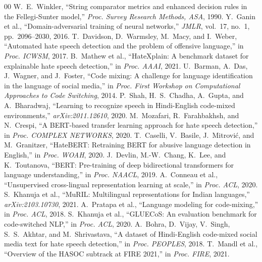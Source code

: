 \documentclass[conference]{IEEEtran}
\begin{document}
\begin{thebibliography}{00}
 W.~E.~Winkler, ``String comparator metrics and enhanced decision rules in the Fellegi-Sunter model,'' \textit{Proc. Survey Research Methods, ASA}, 1990.
 Y.~Ganin et al., ``Domain-adversarial training of neural networks,'' \textit{JMLR}, vol.~17, no.~1, pp.~2096--2030, 2016.
 T.~Davidson, D.~Warmsley, M.~Macy, and I.~Weber, ``Automated hate speech detection and the problem of offensive language,'' in \textit{Proc. ICWSM}, 2017.
 B.~Mathew et al., ``HateXplain: A benchmark dataset for explainable hate speech detection,'' in \textit{Proc. AAAI}, 2021.
 U.~Barman, A.~Das, J.~Wagner, and J.~Foster, ``Code mixing: A challenge for language identification in the language of social media,'' in \textit{Proc. First Workshop on Computational Approaches to Code Switching}, 2014.
 P.~Shah, H.~S.~Chadha, A.~Gupta, and A.~Bharadwaj, ``Learning to recognize speech in Hindi-English code-mixed environments,'' \textit{arXiv:2011.12610}, 2020.
 M.~Mozafari, R.~Farahbakhsh, and N.~Crespi, ``A BERT-based transfer learning approach for hate speech detection,'' in \textit{Proc. COMPLEX NETWORKS}, 2020.
 T.~Caselli, V.~Basile, J.~Mitrovi{\'c}, and M.~Granitzer, ``HateBERT: Retraining BERT for abusive language detection in English,'' in \textit{Proc. WOAH}, 2020.
 J.~Devlin, M.-W.~Chang, K.~Lee, and K.~Toutanova, ``BERT: Pre-training of deep bidirectional transformers for language understanding,'' in \textit{Proc. NAACL}, 2019.
 A.~Conneau et al., ``Unsupervised cross-lingual representation learning at scale,'' in \textit{Proc. ACL}, 2020.
 S.~Khanuja et al., ``MuRIL: Multilingual representations for Indian languages,'' \textit{arXiv:2103.10730}, 2021.
 A.~Pratapa et al., ``Language modeling for code-mixing,'' in \textit{Proc. ACL}, 2018.
 S.~Khanuja et al., ``GLUECoS: An evaluation benchmark for code-switched NLP,'' in \textit{Proc. ACL}, 2020.
 A.~Bohra, D.~Vijay, V.~Singh, S.~S.~Akhtar, and M.~Shrivastava, ``A dataset of Hindi-English code-mixed social media text for hate speech detection,'' in \textit{Proc. PEOPLES}, 2018.
 T.~Mandl et al., ``Overview of the HASOC subtrack at FIRE 2021,'' in \textit{Proc. FIRE}, 2021.

\end{thebibliography}
\end{document}
